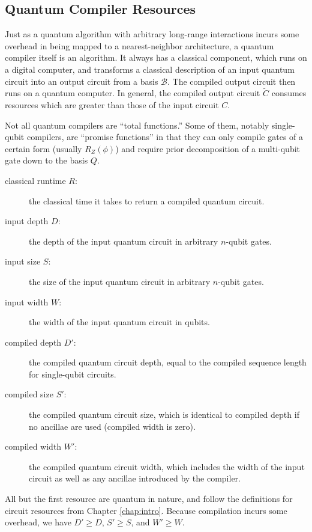 \subsection{Quantum Compiler Resources}
\label{subsec:qcompile-resources}

Just as a quantum algorithm with arbitrary long-range interactions incurs
some overhead in being mapped to a nearest-neighbor architecture,
a quantum compiler itself is an algorithm. It always has a classical
component, which runs on a digital computer, and transforms a classical
description of an input quantum circuit into an output circuit from
a basis $\mathcal{B}$. The compiled output circuit then runs on a
quantum computer. In general, the compiled output circuit $\tilde{C}$ consumes
resources which are greater than those of the input circuit $C$.

Not all quantum compilers are ``total functions.'' Some of them, notably
single-qubit compilers, are ``promise functions'' in that they can
only compile gates of a certain form (usually $R_Z(\phi)$) and require
prior decomposition of a multi-qubit gate down to the basis
$Q$.

\begin{description}
\item[classical runtime $R$:] the classical time it takes to return a 
compiled quantum circuit.
\item[input depth $D$:] the depth of the input quantum circuit in arbitrary
$n$-qubit gates.
\item[input size $S$:] the size of the input quantum circuit in arbitrary
$n$-qubit gates.
\item[input width $W$:] the width of the input quantum circuit in qubits.
\item[compiled depth $D'$:] the compiled quantum circuit depth, equal to
the compiled sequence length for single-qubit circuits.
\item[compiled size $S'$:] the compiled quantum circuit size, which is
identical to compiled depth if no ancillae are used (compiled width is zero).
\item[compiled width $W'$:] the compiled quantum circuit width, which includes
the width of the input circuit as well as any ancillae introduced by
the compiler.
\end{description}

All but the first resource are quantum in nature, and follow the definitions
for circuit resources from Chapter \ref{chap:intro}. Because
compilation incurs some overhead, we have $D' \ge D$, $S' \ge S$, and
$W' \ge W$.

